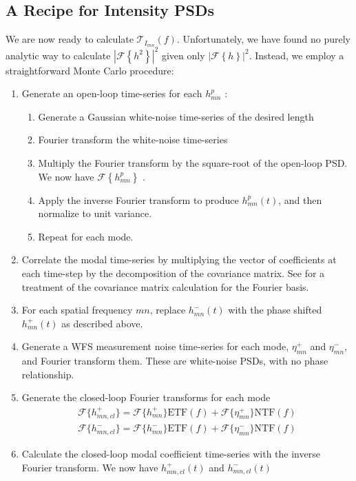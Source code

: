 \documentclass[10pt,preprint]{aastex631}
\begin{document}
\subsection{A Recipe for Intensity PSDs}
We are now ready to calculate $\mathcal{T}_{I_{mn}}(f)$.  Unfortunately, we have found no purely analytic way to calculate $\left| \mathcal{F}\left\{ h^2 \right\} \right|^2$ given only $\left| \mathcal{F}\left\{ h \right\} \right|^2$.  Instead, we employ a straightforward Monte Carlo procedure:
\begin{enumerate}
\item Generate an open-loop time-series for each $h_{mn}^p$ \label{step:olh}:
\begin{enumerate}
\item Generate a Gaussian white-noise time-series of the desired length
\item Fourier transform the white-noise time-series
\item Multiply the Fourier transform by the square-root of the open-loop PSD.  We now have $\mathcal{F}\left\{h_{mn}^p\right\}$ \citep[cf.][]{kasdin_falpha}.
\item Apply the inverse Fourier transform to produce $h_{mn}^p(t)$, and then normalize to unit variance.
\item Repeat for each mode.
\end{enumerate}
\item Correlate the modal time-series by multiplying the vector of coefficients at each time-step by the decomposition of the covariance matrix.  See \citet{2018JATIS...4a9001M} for a treatment of the covariance matrix calculation for the Fourier basis.
\item For each spatial frequency $mn$, replace $h_{mn}^-(t)$ with the phase shifted $h_{mn}^+(t)$ as described above.
\item Generate a WFS measurement noise time-series for each mode, $\eta_{mn}^+$ and $\eta_{mn}^-$, and Fourier transform them.  These are white-noise PSDs, with no phase relationship.
\item Generate the closed-loop Fourier transforms for each mode \label{step:clh}
\begin{eqnarray}
\mathcal{F}\{h_{mn,cl}^+\} = \mathcal{F}\{h_{mn}^+\} \mathrm{ETF}(f) + \mathcal{F}\{\eta_{mn}^+\} \mathrm{NTF}(f) \\
\mathcal{F}\{h_{mn,cl}^-\} = \mathcal{F}\{h_{mn}^-\} \mathrm{ETF}(f) + \mathcal{F}\{\eta_{mn}^-\} \mathrm{NTF}(f) \nonumber
\end{eqnarray}
\item Calculate the closed-loop modal coefficient time-series with the inverse Fourier transform.  We now have $h_{mn,cl}^+(t)$ and $h_{mn,cl}^-(t)$ 

\end{enumerate}
\end{document}
